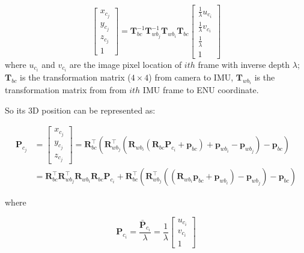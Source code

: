 \documentclass[12pt]{report}   %
\begin{document}
\begin{equation}
	\left[\begin{array}{c}
	{x_{c_{j}}} \\ {y_{c_{j}}} \\ {z_{c_{j}}} \\ {1}
	\end{array}\right] =
	\mathbf{T}_{b c}^{-1} 
	\mathbf{T}_{w b_{j}}^{-1} 
	\mathbf{T}_{w b_{i}} 
	\mathbf{T}_{b c}
	\left[\begin{array}{c}
	{\frac{1}{\lambda} u_{c_{i}}} \\ 
	{\frac{1}{\lambda} v_{c_{i}}} \\ 
	{\frac{1}{\lambda}} \\ 
	{1}
	\end{array}\right]\label{reproj_error}
\end{equation}
where $u_{c_i}$ and $v_{c_i}$ are the image pixel location of $ith$ frame with inverse depth $\lambda$; $\mathbf{T}_{b c}$ is the transformation matrix ($4\times4$) from camera to IMU, $\mathbf{T}_{w b_{i}}$ is the transformation matrix from from $ith$ IMU frame to ENU coordinate.
	
	So its 3D position can be represented as:
	
\begin{equation}
	\label{equ:pcj}
	\begin{aligned} 
	\mathbf{P}_{c_{j}} 
	&=
	\left[\begin{array}{c}
	{x_{c_{j}}} \\ {y_{c_{j}}} \\ {z_{c_{j}}}
	\end{array}\right] 
	=
	\mathbf{R}_{b c}^{\top} \left(
	\mathbf{R}_{w b_{j}}^{\top} \left(
	\mathbf{R}_{w b_{i}} \left(
	\mathbf{R}_{b c} 
	\mathbf{P}_{c_i}
	+ \mathbf{p}_{b c} \right)
	+ \mathbf{p}_{w b_{i}} - \mathbf{p}_{w b_{j}}\right)
	- \mathbf{p}_{b c}\right) \\
	&=
	\mathbf{R}_{b c}^{\top} 
	\mathbf{R}_{w b_{j}}^{\top} 
	\mathbf{R}_{w b_{i}} 
	\mathbf{R}_{b c} 
	\mathbf{P}_{c_i} +
	\mathbf{R}_{b c}^{\top}
	\left(\mathbf{R}_{w b_{j}}^{\top} 
	\left(\left(\mathbf{R}_{w b_{i}} \mathbf{p}_{b c}+\mathbf{p}_{w b_{i}}\right)
	-\mathbf{p}_{w b_{j}}\right)-\mathbf{p}_{b c}\right) 
	\end{aligned}
\end{equation}
	
where 

\begin{equation}
	\label{equ:pci}
	\mathbf{P}_{c_i} = \frac{\bar{\mathbf{P}}_{c_{i}}}{\lambda} = 
	\frac{1}{\lambda}
	\left[\begin{array}{c}
	{u_{c_{i}}} \\ {v_{c_{i}}} \\ {1}
	\end{array}\right]
\end{equation}
	
\end{document}

